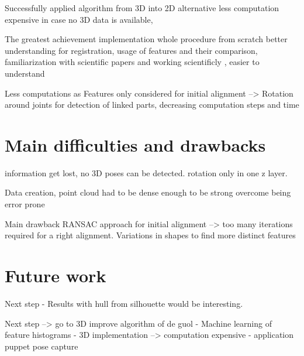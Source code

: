 Successfully applied algorithm from 3D into 2D
alternative less computation expensive in case no 3D data is available,

The greatest achievement implementation whole procedure from scratch better understanding  for registration, usage of features and their comparison, familiarization with scientific papers and working scientificly , easier to understand

Less computations as Features only considered for initial alignment --> Rotation around joints for detection of linked parts, decreasing computation steps and time


\section{Main difficulties and drawbacks}

information get lost, no 3D poses can be detected. rotation only in one z layer. 

Data creation, point cloud had to be dense enough to be strong overcome being error prone

Main drawback RANSAC approach for initial alignment --> too many iterations required for a right alignment. 
Variations in shapes to find more distinct features

	
\section{Future work}

Next step
- Results with hull from silhouette would be interesting.


Next step --> go to 3D improve algorithm of de guol
- Machine learning of feature histograms
- 3D implementation --> computation expensive
- application puppet pose capture

